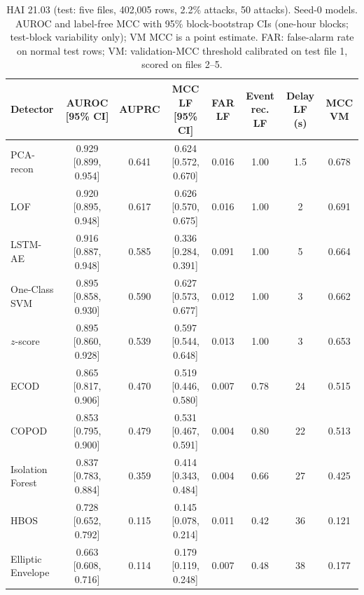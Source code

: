 \documentclass[11pt]{article}
\begin{document}
\begin{table}[t]
\centering\small
\caption{HAI 21.03 (test: five files, 402{,}005 rows, 2.2\% attacks, 50 attacks).
Seed-0 models. AUROC and label-free MCC with 95\% block-bootstrap CIs (one-hour blocks;
test-block variability only); VM MCC is a point estimate. FAR:
false-alarm rate on normal test rows; VM: validation-MCC threshold calibrated on test
file 1, scored on files 2--5.}
\label{tab:hai}
\begin{tabular}{lccccccc}
\toprule
Detector & AUROC [95\% CI] & AUPRC & MCC LF [95\% CI] & FAR LF & Event rec. LF & Delay LF (s) & MCC VM \\
\midrule
PCA-recon & 0.929 [0.899, 0.954] & 0.641 & 0.624 [0.572, 0.670] & 0.016 & 1.00 & 1.5 & 0.678 \\
LOF & 0.920 [0.895, 0.948] & 0.617 & 0.626 [0.570, 0.675] & 0.016 & 1.00 & 2 & 0.691 \\
LSTM-AE & 0.916 [0.887, 0.948] & 0.585 & 0.336 [0.284, 0.391] & 0.091 & 1.00 & 5 & 0.664 \\
One-Class SVM & 0.895 [0.858, 0.930] & 0.590 & 0.627 [0.573, 0.677] & 0.012 & 1.00 & 3 & 0.662 \\
$z$-score & 0.895 [0.860, 0.928] & 0.539 & 0.597 [0.544, 0.648] & 0.013 & 1.00 & 3 & 0.653 \\
ECOD & 0.865 [0.817, 0.906] & 0.470 & 0.519 [0.446, 0.580] & 0.007 & 0.78 & 24 & 0.515 \\
COPOD & 0.853 [0.795, 0.900] & 0.479 & 0.531 [0.467, 0.591] & 0.004 & 0.80 & 22 & 0.513 \\
Isolation Forest & 0.837 [0.783, 0.884] & 0.359 & 0.414 [0.343, 0.484] & 0.004 & 0.66 & 27 & 0.425 \\
HBOS & 0.728 [0.652, 0.792] & 0.115 & 0.145 [0.078, 0.214] & 0.011 & 0.42 & 36 & 0.121 \\
Elliptic Envelope & 0.663 [0.608, 0.716] & 0.114 & 0.179 [0.119, 0.248] & 0.007 & 0.48 & 38 & 0.177 \\
\bottomrule
\end{tabular}
\end{table}
\end{document}
